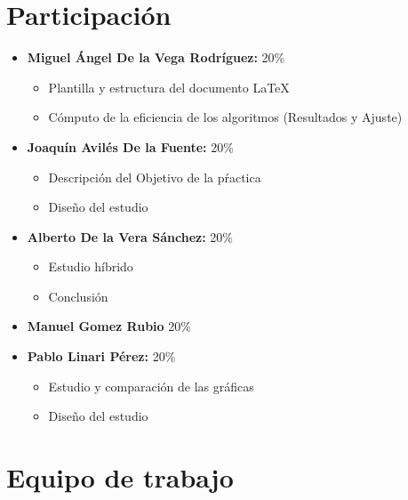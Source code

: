 \documentclass[11pt]{article}
\begin{document}
                                                

\tableofcontents %

\newpage %

\section{Participación}
\begin{itemize}
    \item \textbf{Miguel Ángel De la Vega Rodríguez:} 20\%
    \begin{itemize}
        \item Plantilla y estructura del documento \LaTeX
        \item Cómputo de la eficiencia de los algoritmos (Resultados y Ajuste)
    \end{itemize}
    \item \textbf{Joaquín Avilés De la Fuente:} 20\%
    \begin{itemize}
        \item Descripción del Objetivo de la pŕactica
        \item Diseño del estudio
    \end{itemize}
    \item \textbf{Alberto De la Vera Sánchez: } 20\%
    \begin{itemize}
        \item Estudio híbrido 
        \item Conclusión
    \end{itemize}
    \item \textbf{Manuel Gomez Rubio} 20\%
    \item \textbf{Pablo Linari Pérez:} 20\%
    \begin{itemize}
        \item Estudio y comparación de las gráficas
        \item Diseño del estudio
    \end{itemize}
\end{itemize}

\section{Equipo de trabajo}
\end{document}
